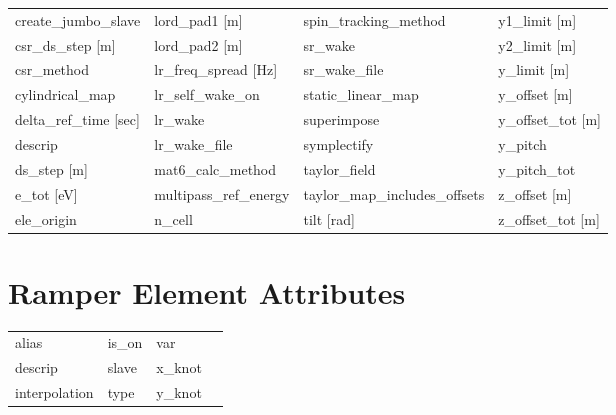 \begin{tabular}{llll}
create_jumbo_slave               & lord_pad1 [m]                    & spin_tracking_method             & y1_limit [m]                     \\
csr_ds_step [m]                  & lord_pad2 [m]                    & sr_wake                          & y2_limit [m]                     \\
csr_method                       & lr_freq_spread [Hz]              & sr_wake_file                     & y_limit [m]                      \\
cylindrical_map                  & lr_self_wake_on                  & static_linear_map                & y_offset [m]                     \\
delta_ref_time [sec]             & lr_wake                          & superimpose                      & y_offset_tot [m]                 \\
descrip                          & lr_wake_file                     & symplectify                      & y_pitch                          \\
ds_step [m]                      & mat6_calc_method                 & taylor_field                     & y_pitch_tot                      \\
e_tot [eV]                       & multipass_ref_energy             & taylor_map_includes_offsets      & z_offset [m]                     \\
ele_origin                       & n_cell                           & tilt [rad]                       & z_offset_tot [m]                 \\
 \bottomrule
 \end{tabular}
 \vfill
 
 \section{Ramper Element Attributes}
 \label{s:list.ramper}
 
 \begin{tabular}{llll} \toprule
alias                            & is_on                            & var                              &                                  \\
descrip                          & slave                            & x_knot                           &                                  \\
interpolation                    & type                             & y_knot                           &                                  \\
 \bottomrule
 \end{tabular}
 \vfill
 
